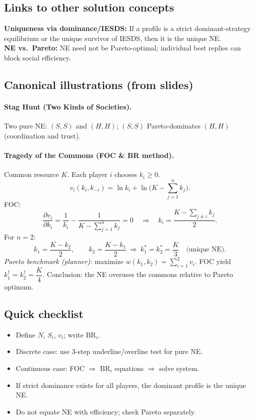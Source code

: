 \documentclass[11pt]{article}
\newcommand{\br}{\mathrm{BR}}
\begin{document}
\begin{multicols}{2}
\subsection*{Links to other solution concepts}
\textbf{Uniqueness via dominance/IESDS:} If a profile is a strict dominant-strategy equilibrium or the unique survivor of IESDS, then it is the unique NE. \\
\textbf{NE vs.\ Pareto:} NE need not be Pareto-optimal; individual best replies can block social efficiency.

\subsection*{Canonical illustrations (from slides)}
\paragraph{Stag Hunt (Two Kinds of Societies).} Two pure NE: $(S,S)$ and $(H,H)$; $(S,S)$ Pareto-dominates $(H,H)$ (coordination and trust).

\paragraph{Tragedy of the Commons (FOC \& BR method).}
Common resource $K$. Each player $i$ chooses $k_i\ge 0$.
\[
v_i(k_i,k_{-i})=\ln k_i+\ln\!\Big(K-\sum_{j=1}^n k_j\Big).
\]
FOC:
\[
\frac{\partial v_i}{\partial k_i}=\frac{1}{k_i}-\frac{1}{K-\sum_{j=1}^n k_j}=0
\quad\Longrightarrow\quad
k_i=\frac{K-\sum_{j\ne i}k_j}{2}.
\]
For $n=2$:
\[
k_1=\frac{K-k_2}{2},\qquad k_2=\frac{K-k_1}{2}
\ \Longrightarrow\ 
k_1^*=k_2^*=\frac{K}{3}\quad\text{(unique NE)}.
\]
\emph{Pareto benchmark (planner):} maximize $w(k_1,k_2)=\sum_{i=1}^2 v_i$.
FOC yield $k_1^\dagger=k_2^\dagger=\dfrac{K}{4}$.
Conclusion: the NE overuses the commons relative to Pareto optimum.

\subsection*{Quick checklist}
\begin{itemize}
\item Define $N$, $S_i$, $v_i$; write $\br_i$.
\item Discrete case: use 3-step underline/overline test for pure NE.
\item Continuous case: FOC $\Rightarrow$ $\br_i$ equations $\Rightarrow$ solve system.
\item If strict dominance exists for all players, the dominant profile is the unique NE.
\item Do not equate NE with efficiency; check Pareto separately.
\end{itemize}



\end{multicols}
\end{document}
